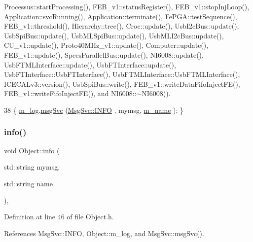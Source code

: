 Processus\+::start\+Processing(), F\+E\+B\+\_\+v1\+::status\+Register(), F\+E\+B\+\_\+v1\+::stop\+Inj\+Loop(), Application\+::svc\+Running(), Application\+::terminate(), Fe\+P\+G\+A\+::test\+Sequence(), F\+E\+B\+\_\+v1\+::threshold(), Hierarchy\+::tree(), Croc\+::update(), Usb\+I2c\+Bus\+::update(), Usb\+Spi\+Bus\+::update(), Usb\+M\+L\+Spi\+Bus\+::update(), Usb\+M\+L\+I2c\+Bus\+::update(), C\+U\+\_\+v1\+::update(), Proto40\+M\+Hz\+\_\+v1\+::update(), Computer\+::update(), F\+E\+B\+\_\+v1\+::update(), Specs\+Parallel\+Bus\+::update(), N\+I6008\+::update(), Usb\+F\+T\+M\+L\+Interface\+::update(), Usb\+F\+T\+Interface\+::update(), Usb\+F\+T\+Interface\+::\+Usb\+F\+T\+Interface(), Usb\+F\+T\+M\+L\+Interface\+::\+Usb\+F\+T\+M\+L\+Interface(), I\+C\+E\+C\+A\+Lv3\+::version(), Usb\+Spi\+Bus\+::write(), F\+E\+B\+\_\+v1\+::write\+Data\+Fifo\+Inject\+F\+E(), F\+E\+B\+\_\+v1\+::write\+Fifo\+Inject\+F\+E(), and N\+I6008\+::$\sim$\+N\+I6008().


\begin{DoxyCode}
38 \{ \hyperlink{classObject_a0d269813dd7ac1f24bc143031e2963f2}{m\_log}.\hyperlink{classMsgSvc_ad25f18047920cc59a314e5098259711c}{msgSvc} (\hyperlink{classMsgSvc_ae671eb7301996cd049d2da8a65925926ad2fcf3f3e734fc41ee097cc23670ce51}{MsgSvc::INFO}    , mymsg, \hyperlink{classObject_a8b83c95c705d2c3ba0d081fe1710f48d}{m\_name} ); \}
\end{DoxyCode}
\mbox{\label{classObject_a1ca123253dfd30fc28b156f521dcbdae}} 
\subsubsection{\texorpdfstring{info()}{info()}\hspace{0.1cm}{\footnotesize\ttfamily [2/2]}}
{\footnotesize\ttfamily void Object\+::info (\begin{DoxyParamCaption}\item[{std\+::string}]{mymsg,  }\item[{std\+::string}]{name }\end{DoxyParamCaption})\hspace{0.3cm}{\ttfamily [inline]}, {\ttfamily [inherited]}}



Definition at line 46 of file Object.\+h.



References Msg\+Svc\+::\+I\+N\+FO, Object\+::m\+\_\+log, and Msg\+Svc\+::msg\+Svc().


